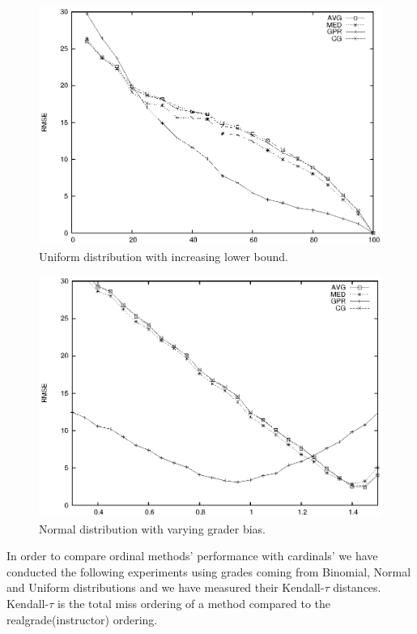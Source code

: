 \documentclass[a4paper]{article}
\begin{document}
\begin{figure}[H]
\centering
\includegraphics[width=1\textwidth]{figure03}
\caption{Uniform distribution with increasing lower bound.}
\end{figure}

\begin{figure}[H]
\centering
\includegraphics[width=1\textwidth]{figure04}
\caption{Normal distribution with varying grader bias.}
\end{figure}
\clearpage

In order to compare ordinal methods' performance with cardinals' we have conducted the following
experiments using grades coming from Binomial, Normal and Uniform distributions and we have
measured their Kendall-$\tau$ distances. Kendall-$\tau$ is the total miss ordering of a method
compared to the realgrade(instructor) ordering.\\
\end{document}
